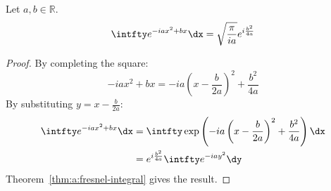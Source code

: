 \documentclass[a4paper]{extarticle}
\begin{document}
\begin{thm}
  \label{thm:a:shifted-fresnel-integral}
  Let $a, b \in \mathbb{R}$.
  \begin{align}
    \label{eqn:a:shifted-fresnel-integral}
    \intfty e^{-iax^2 + bx} \dx = \sqrt{\frac{\pi}{ia}} e^{i \frac{b^2}{4a}}
  \end{align}
  \begin{proof}
    By completing the square:
    \begin{equation*}
      -iax^2 + bx = -ia\left(x - \frac{b}{2a}\right)^2 + \frac{b^2}{4a}
    \end{equation*}
    By substituting $y = x - \frac{b}{2a}$:
    \begin{align*}
      \intfty e^{-iax^2 + bx} \dx
       & = \intfty \exp\left(-ia\left(x - \frac{b}{2a}\right)^2 + \frac{b^2}{4a}\right) \dx \\
       & = e^{i \frac{b^2}{4a}} \intfty e^{-iay^2} \dy
    \end{align*}
    Theorem~\ref{thm:a:fresnel-integral} gives the result.
  \end{proof}
\end{thm}
\end{document}
